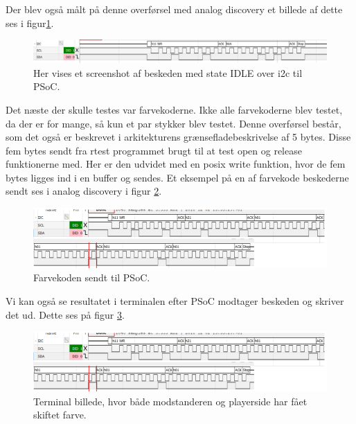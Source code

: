 \documentclass[Modultest/Modultest_main.tex]{subfiles}
\begin{document}
Der blev også målt på denne overførsel med analog discovery et billede af dette ses i figur\ref{fig:write_analog}.
\begin{figure}[H]
    \centering
    \includegraphics[width=\textwidth]{Modultest/i2c_interruptDriver/graphics/write_state_analog.PNG}
    \caption{Her vises et screenshot af beskeden med state IDLE over i2c til PSoC.}
    \label{fig:write_analog}
\end{figure}
Det næste der skulle testes var farvekoderne. Ikke alle farvekoderne blev testet, da der er for mange, så kun et par stykker blev testet. Denne overførsel består, som det også er beskrevet i arkitekturens grænsefladebeskrivelse af 5 bytes. Disse fem bytes sendt fra rtest programmet brugt til at test open og release funktionerne med. Her er den udvidet med en posix write funktion, hvor de fem bytes ligges ind i en buffer og sendes. Et eksempel på en af farvekode beskederne sendt ses i analog discovery i figur \ref{fig:write_color}.
\begin{figure}[H]
    \centering
    \includegraphics[width=\textwidth]{Modultest/i2c_interruptDriver/graphics/write_farvekode_analog.PNG}
    \caption{Farvekoden sendt til PSoC.}
    \label{fig:write_color}
\end{figure}
Vi kan også se resultatet i terminalen efter PSoC modtager beskeden og skriver det ud. Dette ses på figur \ref{fig:terminal_color}.
\begin{figure}[H]
    \centering
    \includegraphics[width=\textwidth]{Modultest/i2c_interruptDriver/graphics/write_farvekode_analog.PNG}
    \caption{Terminal billede, hvor både modstanderen og playerside har fået skiftet farve.}
    \label{fig:terminal_color}
\end{figure}
\end{document}
